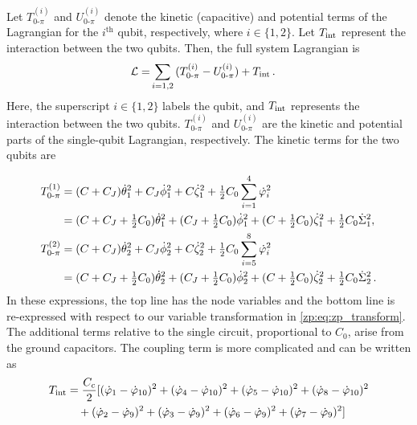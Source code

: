Let $T_{0\text{-}\pi}^{(i)}$ and $U_{0\text{-}\pi}^{(i)}$ denote the kinetic (capacitive) and potential terms of the Lagrangian for the $i^\text{th}$ \zps qubit, respectively, where $i \in \{1, 2\}$.
Let $T_{\rm int}$ represent the interaction between the two qubits.
Then, the full system Lagrangian is
\begin{align}\label{zp:eq:full_sys_lagrangian}
\mathcal{L}
=& \sum_{i=1,2}{(T_{0\text{-}\pi}^{(i)} - U_{0\text{-}\pi}^{(i)} )} + T_{\rm int} \, .
\end{align}
Here, the superscript $i\in\{1,2\}$ labels the qubit, and $T_{\rm int}$ represents the interaction between the two \zps qubits.
$T_{0\text{-}\pi}^{(i)}$ and $U_{0\text{-}\pi}^{(i)} $ are the kinetic and potential parts of the single-qubit Lagrangian, respectively.
The kinetic terms for the two \zps qubits are
\begin{widetext}
\begin{align}
T_{0\text{-}\pi}^{(1)}
&= (C+C_{J})\dot{\theta}_1^2 +  C_J\dot{\phi}_1^2 + C\dot{\zeta}_1^2 + \tfrac{1}{2} C_0 \sum_{i=1}^{4}{\dot{\varphi}_i^2} \nonumber\\
& =  ( C+C_J+\tfrac{1}{2} C_0  ) \dot{\theta}_1^2 +  (C_J+\tfrac{1}{2} C_0) \dot{\phi}_1^2 + ( C+\tfrac{1}{2} C_0 ) \dot{\zeta}_1^2 +\tfrac{1}{2} C_0  \dot{\Sigma}_1^2,  \\
T_{0\text{-}\pi}^{(2)}
&= (C+C_{J})\dot{\theta}_2^2 +  C_J\dot{\phi}_2^2 + C\dot{\zeta}_2^2 + \tfrac{1}{2} C_0  \sum_{i=5}^{8}{\dot{\varphi}_i^2} \nonumber \\
&= ( C+C_J+\tfrac{1}{2} C_0 ) \dot{\theta}_2^2 +  (C_J+\tfrac{1}{2} C_0) \dot{\phi}_2^2 + ( C+\tfrac{1}{2}  C_0 ) \dot{\zeta}_2^2 +\tfrac{1}{2} C_0 \dot{\Sigma}_2^2 \, .
\end{align}
In these expressions, the top line has the node variables and the bottom line is re-expressed with respect to our variable transformation in \cref{zp:eq:zp_transform}.
The additional terms relative to the single \zps circuit, proportional to $C_0$, arise from the ground capacitors.
The coupling term is more complicated and can be written as
\begin{align}
T_{\rm int}
&=\frac{C_{c}}{2}
[(\dot{\varphi }_1-\dot{\varphi }_{10}){}^2 +
(\dot{\varphi }_4-\dot{\varphi }_{10}){}^2 +
(\dot{\varphi }_5-\dot{\varphi }_{10}){}^2 +
(\dot{\varphi }_8-\dot{\varphi }_{10}){}^2 \nonumber
\\
&\quad +(\dot{\varphi }_2-\dot{\varphi }_9){}^2 +
(\dot{\varphi }_3-\dot{\varphi }_9){}^2 +
(\dot{\varphi }_6-\dot{\varphi }_9){}^2 +
(\dot{\varphi }_7-\dot{\varphi }_9){}^2]  \nonumber
\\

\end{align}
\end{widetext}
